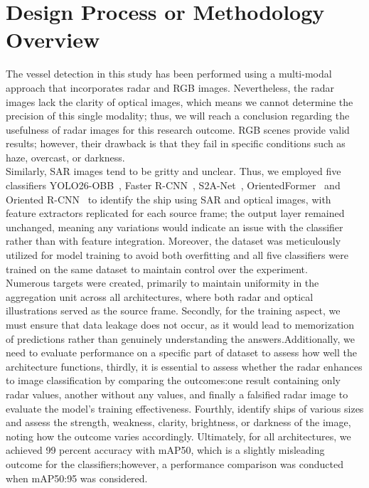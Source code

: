 \section{Design Process or Methodology Overview
}

The vessel detection in this study has been performed using a multi-modal approach that incorporates radar and RGB images. Nevertheless, the radar images lack the clarity of optical images, which means we cannot determine the precision of this single modality; thus, we will reach a conclusion regarding the usefulness of radar images for this research outcome. RGB scenes provide valid results; however, their drawback is that they fail in specific conditions such as haze, overcast, or darkness.\\
Similarly, SAR images tend to be gritty and unclear. Thus, we employed five classifiers YOLO26-OBB~\cite{jocher2026ultralytics}, Faster R-CNN~\cite{7485869}, S2A-Net~\cite{han2021align}, OrientedFormer~\cite{zhao2024orientedformer} and Oriented R-CNN~\cite{xie2021oriented} to identify the ship using SAR and optical images, with feature extractors replicated for each source frame; the output layer remained unchanged, meaning any variations would indicate an issue with the classifier rather than with feature integration. Moreover, the dataset was meticulously utilized for model training to avoid both overfitting  and all five classifiers were trained on the same dataset to maintain control over the experiment.\\

Numerous targets were created, primarily to maintain uniformity in the aggregation unit across all architectures, where both radar and optical illustrations served as the source frame. Secondly, for the training aspect, we must ensure that data leakage does not occur, as it would lead to memorization of predictions rather than genuinely understanding the answers.Additionally, we need to evaluate performance on a specific part of dataset to assess how well the architecture functions, thirdly, it is essential to assess whether the radar enhances to image classification by comparing the outcomes:one result containing only radar values, another without any values, and finally a falsified radar image to evaluate the model's training effectiveness. Fourthly, identify ships of various sizes and assess the strength, weakness, clarity, brightness, or darkness of the image, noting how the outcome varies accordingly. Ultimately, for all architectures, we achieved 99 percent accuracy with mAP50, which is a slightly misleading outcome for the classifiers;however, a performance comparison was conducted when mAP50:95 was considered.


